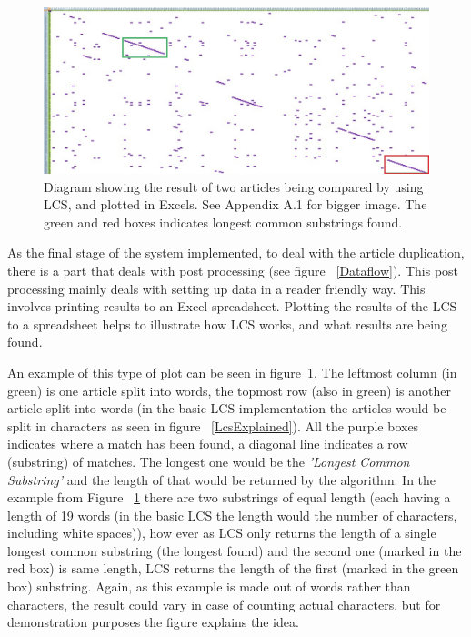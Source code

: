 \begin{figure}
	\centering
	\includegraphics[scale=0.4]{figures/LcsExample}
	\caption{Diagram showing the result of two articles being compared by using LCS, and plotted in Excels. See Appendix A.1 for bigger image. The green and red boxes indicates longest common substrings found.}
	\label{LcsEx}
\end{figure}

As the final stage of the system implemented, to deal with the article duplication, there is a part that deals with post processing (see figure ~\ref{Dataflow}). This post processing mainly deals with setting up data in a reader friendly way. This involves printing results to an Excel spreadsheet. Plotting the results of the LCS to a spreadsheet helps to illustrate how LCS works, and what results are being found. 

An example of this type of plot can be seen in figure~\ref{LcsEx}. The leftmost column (in green) is one article split into words, the topmost row (also in green) is another article split into words (in the basic LCS implementation the articles would be split in characters as seen in figure ~\ref{LcsExplained}). All the purple boxes indicates where a match has been found, a diagonal line indicates a row (substring) of matches. The longest one would be the \textit{'Longest Common Substring'} and the length of that would be returned by the algorithm. In the example from Figure ~\ref{LcsEx} there are two substrings of equal length (each having a length of 19 words (in the basic LCS the length would the number of characters, including white spaces)), how ever as LCS only returns the length of a single longest common substring (the longest found) and the second one (marked in the red box) is same length, LCS returns the length of the first (marked in the green box) substring. Again, as this example is made out of words rather than characters, the result could vary in case of counting actual characters, but for demonstration purposes the figure explains the idea.

